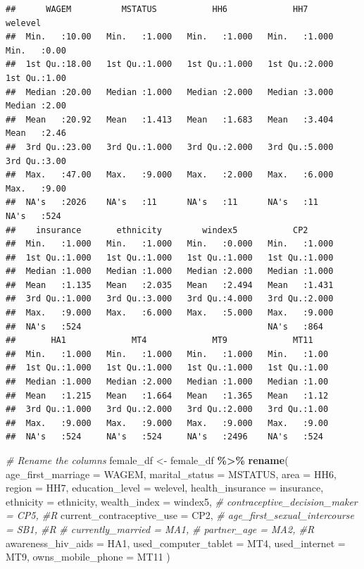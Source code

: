 \documentclass[
]{article}
\newenvironment{Shaded}{\begin{snugshade}}{\end{snugshade}}
\newcommand{\AttributeTok}[1]{\textcolor[rgb]{0.13,0.29,0.53}{#1}}
\newcommand{\CommentTok}[1]{\textcolor[rgb]{0.56,0.35,0.01}{\textit{#1}}}
\newcommand{\FunctionTok}[1]{\textcolor[rgb]{0.13,0.29,0.53}{\textbf{#1}}}
\newcommand{\NormalTok}[1]{#1}
\newcommand{\OtherTok}[1]{\textcolor[rgb]{0.56,0.35,0.01}{#1}}
\newcommand{\SpecialCharTok}[1]{\textcolor[rgb]{0.81,0.36,0.00}{\textbf{#1}}}
\begin{document}
\begin{verbatim}
##      WAGEM          MSTATUS           HH6             HH7           welevel    
##  Min.   :10.00   Min.   :1.000   Min.   :1.000   Min.   :1.000   Min.   :0.00  
##  1st Qu.:18.00   1st Qu.:1.000   1st Qu.:1.000   1st Qu.:2.000   1st Qu.:1.00  
##  Median :20.00   Median :1.000   Median :2.000   Median :3.000   Median :2.00  
##  Mean   :20.92   Mean   :1.413   Mean   :1.683   Mean   :3.404   Mean   :2.46  
##  3rd Qu.:23.00   3rd Qu.:1.000   3rd Qu.:2.000   3rd Qu.:5.000   3rd Qu.:3.00  
##  Max.   :47.00   Max.   :9.000   Max.   :2.000   Max.   :6.000   Max.   :9.00  
##  NA's   :2026    NA's   :11      NA's   :11      NA's   :11      NA's   :524   
##    insurance       ethnicity        windex5           CP2       
##  Min.   :1.000   Min.   :1.000   Min.   :0.000   Min.   :1.000  
##  1st Qu.:1.000   1st Qu.:1.000   1st Qu.:1.000   1st Qu.:1.000  
##  Median :1.000   Median :1.000   Median :2.000   Median :1.000  
##  Mean   :1.135   Mean   :2.035   Mean   :2.494   Mean   :1.431  
##  3rd Qu.:1.000   3rd Qu.:3.000   3rd Qu.:4.000   3rd Qu.:2.000  
##  Max.   :9.000   Max.   :6.000   Max.   :5.000   Max.   :9.000  
##  NA's   :524                                     NA's   :864    
##       HA1             MT4             MT9             MT11     
##  Min.   :1.000   Min.   :1.000   Min.   :1.000   Min.   :1.00  
##  1st Qu.:1.000   1st Qu.:1.000   1st Qu.:1.000   1st Qu.:1.00  
##  Median :1.000   Median :2.000   Median :1.000   Median :1.00  
##  Mean   :1.215   Mean   :1.664   Mean   :1.365   Mean   :1.12  
##  3rd Qu.:1.000   3rd Qu.:2.000   3rd Qu.:2.000   3rd Qu.:1.00  
##  Max.   :9.000   Max.   :9.000   Max.   :9.000   Max.   :9.00  
##  NA's   :524     NA's   :524     NA's   :2496    NA's   :524
\end{verbatim}

\begin{Shaded}
\begin{Highlighting}[]
\CommentTok{\# Rename the columns}
\NormalTok{female\_df }\OtherTok{\textless{}{-}}\NormalTok{ female\_df }\SpecialCharTok{\%\textgreater{}\%}
  \FunctionTok{rename}\NormalTok{(}
  \AttributeTok{age\_first\_marriage =}\NormalTok{ WAGEM,}
  \AttributeTok{marital\_status =}\NormalTok{ MSTATUS,}
  \AttributeTok{area =}\NormalTok{ HH6,}
  \AttributeTok{region =}\NormalTok{ HH7,}
  \AttributeTok{education\_level =}\NormalTok{ welevel,}
  \AttributeTok{health\_insurance =}\NormalTok{ insurance,}
  \AttributeTok{ethnicity =}\NormalTok{ ethnicity,}
  \AttributeTok{wealth\_index =}\NormalTok{ windex5,}
\CommentTok{\#  contraceptive\_decision\_maker = CP5, \#R}
  \AttributeTok{current\_contraceptive\_use =}\NormalTok{ CP2,}
\CommentTok{\# age\_first\_sexual\_intercourse = SB1, \#R}
\CommentTok{\#  currently\_married = MA1,}
\CommentTok{\#  partner\_age = MA2, \#R}
  \AttributeTok{awareness\_hiv\_aids =}\NormalTok{ HA1,}
  \AttributeTok{used\_computer\_tablet =}\NormalTok{ MT4,}
  \AttributeTok{used\_internet =}\NormalTok{ MT9,}
  \AttributeTok{owns\_mobile\_phone =}\NormalTok{ MT11}
\NormalTok{)}
\end{Highlighting}
\end{Shaded}
\end{document}
